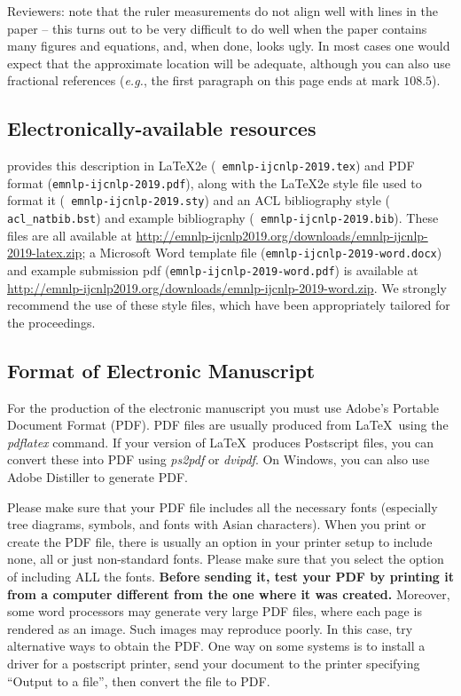 Reviewers: note that the ruler measurements do not align well with lines in the paper -- this turns out to be very difficult to do well when the paper contains many figures and equations, and, when done, looks ugly. In most cases one would expect that the approximate location will be adequate, although you can also use fractional references ({\em e.g.}, the first paragraph on this page ends at mark $108.5$).

\subsection{Electronically-available resources}

\conforg{} provides this description in \LaTeX2e{} ({\small\tt
  emnlp-ijcnlp-2019.tex}) and PDF format ({\small\tt emnlp-ijcnlp-2019.pdf}), along with the \LaTeX2e{} style file used to format it ({\small\tt
  emnlp-ijcnlp-2019.sty}) and an ACL bibliography style ({\small\tt
  acl\_natbib.bst}) and example bibliography ({\small\tt
  emnlp-ijcnlp-2019.bib}).  These files are all available at
{\small \url{http://emnlp-ijcnlp2019.org/downloads/emnlp-ijcnlp-2019-latex.zip}}; 
a Microsoft Word template file ({\small\tt emnlp-ijcnlp-2019-word.docx}) and example submission pdf ({\small\tt emnlp-ijcnlp-2019-word.pdf}) is available at
{\small \url{http://emnlp-ijcnlp2019.org/downloads/emnlp-ijcnlp-2019-word.zip}}.  We strongly recommend the use of these style files, which have been appropriately tailored for the \confname{} proceedings.

\subsection{Format of Electronic Manuscript}
\label{sect:pdf}

For the production of the electronic manuscript you must use Adobe's Portable Document Format (PDF). PDF files are usually produced from \LaTeX\ using the \textit{pdflatex} command. If your version of \LaTeX\ produces Postscript files, you can convert these into PDF using \textit{ps2pdf} or \textit{dvipdf}. On Windows, you can also use Adobe Distiller to generate PDF.

Please make sure that your PDF file includes all the necessary fonts (especially tree diagrams, symbols, and fonts with Asian characters). When you print or create the PDF file, there is usually an option in your printer setup to include none, all or just non-standard fonts.  Please make sure that you select the option of including ALL the fonts. \textbf{Before sending it, test your PDF by printing it from a computer different from the one where it was created.} Moreover, some word processors may generate very large PDF files, where each page is rendered as an image. Such images may reproduce poorly. In this case, try alternative ways to obtain the PDF. One way on some systems is to install a driver for a postscript printer, send your document to the printer specifying ``Output to a file'', then convert the file to PDF.


